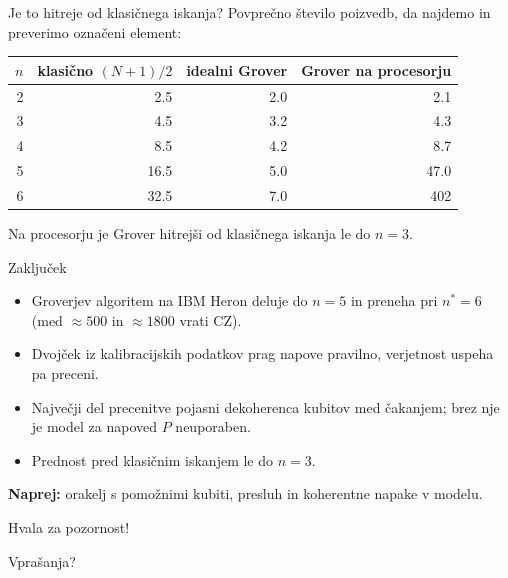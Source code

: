 \documentclass[aspectratio=169, 11pt]{beamer}
\begin{document}
\begin{frame}{Je to hitreje od klasičnega iskanja?}
  Povprečno število poizvedb, da najdemo in preverimo označeni element:

  \vspace{0.6em}
  \centering
  \begin{tabular}{rrrr}
    \toprule
    $n$ & klasično $(N+1)/2$ & idealni Grover & Grover na procesorju \\
    \midrule
    2 & \num{2,5}  & \num{2,0} & \num{2,1} \\
    3 & \num{4,5}  & \num{3,2} & \num{4,3} \\
    4 & \num{8,5}  & \num{4,2} & \num{8,7} \\
    5 & \num{16,5} & \num{5,0} & \alert{\num{47,0}} \\
    6 & \num{32,5} & \num{7,0} & \alert{402} \\
    \bottomrule
  \end{tabular}

  \vspace{0.8em}
  \raggedright
  Na procesorju je Grover hitrejši od klasičnega iskanja \alert{le do $n = 3$}.
\end{frame}

\begin{frame}{Zaključek}
  \begin{itemize}
    \item Groverjev algoritem na IBM Heron deluje do $n = 5$ in preneha pri \alert{$n^* = 6$} (med $\approx 500$ in $\approx \num{1800}$ vrati CZ).
    \item Dvojček iz kalibracijskih podatkov prag \alert{napove pravilno}, verjetnost uspeha pa preceni.
    \item Največji del precenitve pojasni dekoherenca kubitov med čakanjem; brez nje je model za napoved $P$ neuporaben.
    \item Prednost pred klasičnim iskanjem le do $n = 3$.
  \end{itemize}

  \vspace{0.8em}
  \textbf{Naprej:} orakelj s pomožnimi kubiti, presluh in koherentne napake v modelu.
\end{frame}

\begin{frame}[standout]
  Hvala za pozornost!

  \vspace{0.5em}
  {\normalsize Vprašanja?}
\end{frame}
\end{document}
